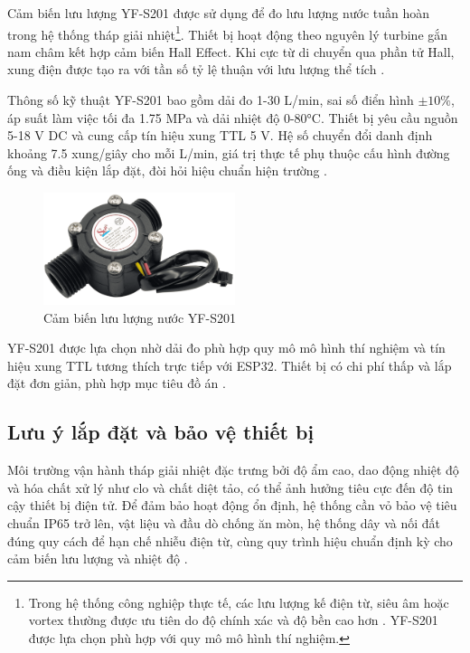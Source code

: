 \documentclass[../main.tex]{subfiles}
\begin{document}
Cảm biến lưu lượng YF-S201 được sử dụng để đo lưu lượng nước tuần hoàn trong hệ thống tháp giải nhiệt\footnote{Trong hệ thống công nghiệp thực tế, các lưu lượng kế điện từ, siêu âm hoặc vortex thường được ưu tiên do độ chính xác và độ bền cao hơn \cite{ashrae2020cooling,epa_watersense_cooling_towers_2012}. YF-S201 được lựa chọn phù hợp với quy mô mô hình thí nghiệm.}. Thiết bị hoạt động theo nguyên lý turbine gắn nam châm kết hợp cảm biến Hall Effect. Khi cực từ di chuyển qua phần tử Hall, xung điện được tạo ra với tần số tỷ lệ thuận với lưu lượng thể tích \cite{datasheet_YFS201}.

Thông số kỹ thuật YF-S201 bao gồm dải đo 1-30 L/min, sai số điển hình $\pm 10\%$, áp suất làm việc tối đa 1.75 MPa và dải nhiệt độ 0-80°C. Thiết bị yêu cầu nguồn 5-18 V DC và cung cấp tín hiệu xung TTL 5 V. Hệ số chuyển đổi danh định khoảng 7.5 xung/giây cho mỗi L/min, giá trị thực tế phụ thuộc cấu hình đường ống và điều kiện lắp đặt, đòi hỏi hiệu chuẩn hiện trường \cite{datasheet_YFS201}.

\begin{figure}[H]
    \centering
    \includegraphics[width=0.5\textwidth]{../Hinhve/YF-S201.png}
    \caption{Cảm biến lưu lượng nước YF-S201 \cite{datasheet_YFS201}}
    \label{fig:yf-s201}
\end{figure}

YF-S201 được lựa chọn nhờ dải đo phù hợp quy mô mô hình thí nghiệm và tín hiệu xung TTL tương thích trực tiếp với ESP32. Thiết bị có chi phí thấp và lắp đặt đơn giản, phù hợp mục tiêu đồ án \cite{datasheet_YFS201}.

\subsection{Lưu ý lắp đặt và bảo vệ thiết bị}
\label{sec:installation_protection}

Môi trường vận hành tháp giải nhiệt đặc trưng bởi độ ẩm cao, dao động nhiệt độ và hóa chất xử lý như clo và chất diệt tảo, có thể ảnh hưởng tiêu cực đến độ tin cậy thiết bị điện tử. Để đảm bảo hoạt động ổn định, hệ thống cần vỏ bảo vệ tiêu chuẩn IP65 trở lên, vật liệu và đầu dò chống ăn mòn, hệ thống dây và nối đất đúng quy cách để hạn chế nhiễu điện từ, cùng quy trình hiệu chuẩn định kỳ cho cảm biến lưu lượng và nhiệt độ \cite{epa_cooling_tower_guide_2017,epa_watersense_cooling_towers_2012}.
\end{document}
